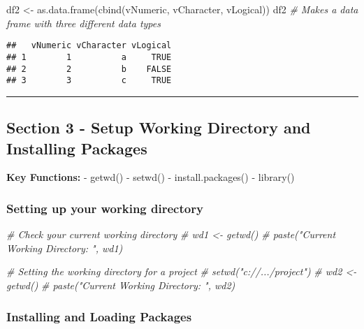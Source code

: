 \documentclass[
]{article}
\newenvironment{Shaded}{\begin{snugshade}}{\end{snugshade}}
\newcommand{\CommentTok}[1]{\textcolor[rgb]{0.56,0.35,0.01}{\textit{#1}}}
\newcommand{\FunctionTok}[1]{\textcolor[rgb]{0.00,0.00,0.00}{#1}}
\newcommand{\NormalTok}[1]{#1}
\newcommand{\OtherTok}[1]{\textcolor[rgb]{0.56,0.35,0.01}{#1}}
\begin{document}
\begin{Shaded}
\begin{Highlighting}[]
\NormalTok{df2 }\OtherTok{\textless{}{-}} \FunctionTok{as.data.frame}\NormalTok{(}\FunctionTok{cbind}\NormalTok{(vNumeric, vCharacter, vLogical))}
\NormalTok{df2  }\CommentTok{\# Makes a data frame with three different data types}
\end{Highlighting}
\end{Shaded}

\begin{verbatim}
##   vNumeric vCharacter vLogical
## 1        1          a     TRUE
## 2        2          b    FALSE
## 3        3          c     TRUE
\end{verbatim}

\begin{center}\rule{0.5\linewidth}{0.5pt}\end{center}

\hypertarget{section-3---setup-working-directory-and-installing-packages}{%
\subsection{Section 3 - Setup Working Directory and Installing
Packages}\label{section-3---setup-working-directory-and-installing-packages}}

\textbf{Key Functions:} - getwd() - setwd() - install.packages() -
library()

\hypertarget{setting-up-your-working-directory}{%
\subsubsection{Setting up your working
directory}\label{setting-up-your-working-directory}}

\begin{Shaded}
\begin{Highlighting}[]
\CommentTok{\# Check your current working directory}
\CommentTok{\# wd1 \textless{}{-} getwd()}
\CommentTok{\# paste("Current Working Directory: ", wd1)}

\CommentTok{\# Setting the working directory for a project}
\CommentTok{\# setwd("c://.../project")}
\CommentTok{\# wd2 \textless{}{-} getwd()}
\CommentTok{\# paste("Current Working Directory: ", wd2)}
\end{Highlighting}
\end{Shaded}

\hypertarget{installing-and-loading-packages}{%
\subsubsection{Installing and Loading
Packages}\label{installing-and-loading-packages}}
\end{document}
